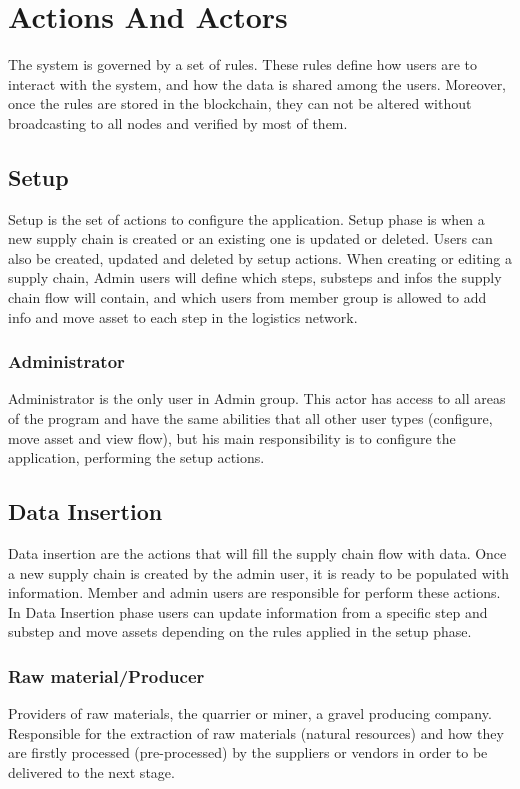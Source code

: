 \section{Actions And Actors}\label{sec:actionsAndActors}

The system is governed by a set of rules. These rules define how users are to interact with the system, and how the data is shared among the users. Moreover, once the rules are stored in the blockchain, they can not be altered without broadcasting to all nodes and verified by most of them.

\subsection{Setup}\label{sec:Setup}
Setup is the set of actions to configure the application. Setup phase is when a new supply chain is created or an existing one is updated or deleted. Users can also be created, updated and deleted by setup actions. When creating or editing a supply chain, Admin users will define which steps, substeps and infos the supply chain flow will contain, and which users from member group is allowed to add info and move asset to each step in the logistics network.

\subsubsection{Administrator}\label{sec:Administrator}
Administrator is the only user in Admin group. This actor has access to all areas of the program and have the same abilities that all other user types (configure, move asset and view flow), but his main responsibility is to configure the application, performing the setup actions. 



\subsection{Data Insertion}\label{sec:DataInsertion}

Data insertion are the actions that will fill the supply chain flow with data. Once a new supply chain is created by the admin user, it is ready to be populated with information. Member and admin users are responsible for perform these actions. In Data Insertion phase users can update information from a specific step and substep and move assets depending on the rules applied in the setup phase.

\subsubsection{Raw material/Producer}\label{sec:Rawmaterial}
Providers of raw materials, the quarrier or miner, a gravel producing company. Responsible for the extraction of raw materials (natural resources) and how they are firstly processed (pre-processed) by the suppliers or vendors in order to be delivered to the next stage.

